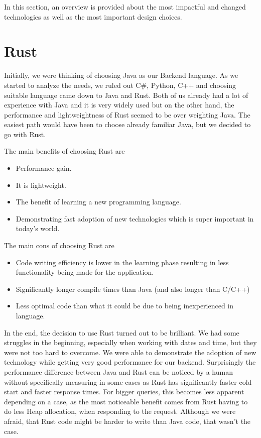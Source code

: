 In this section, an overview is provided about the most impactful and changed technologies as well as the most important design choices.

\section{Rust}\label{sec:rust}
Initially, we were thinking of choosing Java as our Backend language.
As we started to analyze the needs, we ruled out C\#, Python, C++ and choosing suitable language came down to Java and Rust.
Both of us already had a lot of experience with Java and it is very widely used but on the other hand, the performance and lightweightness of Rust seemed to be over weighting Java.
The easiest path would have been to choose already familiar Java, but we decided to go with Rust.

The main benefits of choosing Rust are
\begin{itemize}
    \item Performance gain.
    \item It is lightweight.
    \item The benefit of learning a new programming language.
    \item Demonstrating fast adoption of new technologies which is super important in today's world.
\end{itemize}

The main cons of choosing Rust are
\begin{itemize}
    \item Code writing efficiency is lower in the learning phase resulting in less functionality being made for the application.
    \item Significantly longer compile times than Java (and also longer than C/C++)
    \item Less optimal code than what it could be due to being inexperienced in language.
\end{itemize}

In the end, the decision to use Rust turned out to be brilliant.
We had some struggles in the beginning, especially when working with dates and time, but they were not too hard to overcome.
We were able to demonstrate the adoption of new technology while getting very good performance for our backend.
Surprisingly the performance difference between Java and Rust can be noticed by a human without specifically measuring in some cases
as Rust has significantly faster cold start and faster response times.
For bigger queries, this becomes less apparent depending on a case, as the most noticeable benefit comes from Rust
having to do less Heap allocation, when responding to the request.
Although we were afraid, that Rust code might be harder to write than Java code, that wasn't the case.

